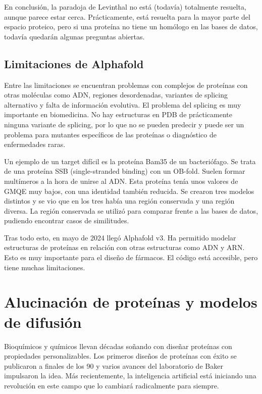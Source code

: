 En conclusión, la paradoja de Levinthal no está (todavía) totalmente resuelta, aunque parece estar cerca. Prácticamente, está resuelta para la mayor parte del espacio proteico, pero si una proteína no tiene un homólogo en las bases de datos, todavía quedarán algunas preguntas abiertas.

\subsection{Limitaciones de Alphafold}
Entre las limitaciones se encuentran problemas con complejos de proteínas con otras moléculas como ADN, regiones desordenadas, variantes de splicing alternativo y falta de información evolutiva. El problema del splicing es muy importante en biomedicina. No hay estructuras en PDB de prácticamente ninguna variante de splicing, por lo que no se pueden predecir y puede ser un problema para mutantes específicos de las proteínas o diagnóstico de enfermedades raras. 

Un ejemplo de un target difícil es la proteína Bam35 de un bacteriófago. Se trata de una proteína SSB (single-stranded binding) con un OB-fold. Suelen formar multímeros a la hora de unirse al ADN. Esta proteína tenía unos valores de GMQE muy bajos, con una identidad también reducida. Se crearon tres modelos distintos y se vio que en los tres había una región conservada y una región diversa. La región conservada se utilizó para comparar frente a las bases de datos, pudiendo encontrar casos de similitudes. 

Tras todo esto, en mayo de 2024 llegó Alphafold v3. Ha permitido modelar estructuras de proteínas en relación con otras estructuras como ADN y ARN. Esto es muy importante para el diseño de fármacos. El código está accesible, pero tiene muchas limitaciones. 

\section{Alucinación de proteínas y modelos de difusión}
Bioquímicos y químicos llevan décadas soñando con diseñar proteínas con propiedades personalizables. Los primeros diseños de proteínas con éxito se publicaron a finales de los 90 y varios avances del laboratorio de Baker impulsaron la idea. Más recientemente, la inteligencia artificial está iniciando una revolución en este campo que lo cambiará radicalmente para siempre.

